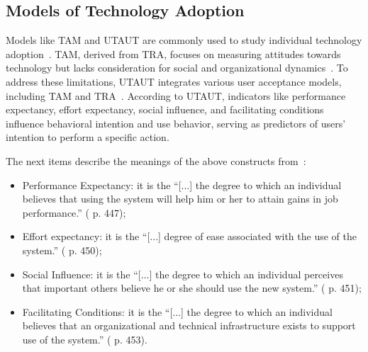 \subsection{Models of Technology Adoption}
\label{sec:chap004002003}

Models like \ac{TAM} and \ac{UTAUT} are commonly used to study individual technology adoption~\cite{HOEHLE201635, MOORE2022102784}.
\ac{TAM}, derived from \ac{TRA}, focuses on measuring attitudes towards technology but lacks consideration for social and organizational dynamics~\cite{RePEc:inm:ormnsc:v:35:y:1989:i:8:p:982-1003, AJZEN1991179, LEGRIS2003191}.
To address these limitations, \ac{UTAUT} integrates various user acceptance models, including \ac{TAM} and \ac{TRA}~\cite{10.2307/30036540}.
According to \ac{UTAUT}, indicators like performance expectancy, effort expectancy, social influence, and facilitating conditions influence behavioral intention and use behavior, serving as predictors of users' intention to perform a specific action.

\vspace{2.00mm}

\noindent
The next items describe the meanings of the above constructs from~\cite{10.2307/30036540}:

\vspace{0.05mm}

\begin{itemize}
\item Performance Expectancy: it is the ``[...] the degree to which an individual believes that using the system will help him or her to attain gains in job performance.'' (\cite{10.2307/30036540} p. 447);
\item Effort expectancy: it is the ``[...] degree of ease associated with the use of the system.'' (\cite{10.2307/30036540} p. 450);
\item Social Influence: it is the ``[...] the degree to which an individual perceives that important others believe he or she should use the new system.'' (\cite{10.2307/30036540} p. 451);
\item Facilitating Conditions: it is the ``[...] the degree to which an individual believes that an organizational and technical infrastructure exists to support use of the system.'' (\cite{10.2307/30036540} p. 453).
\end{itemize}

\vspace{0.05mm}

